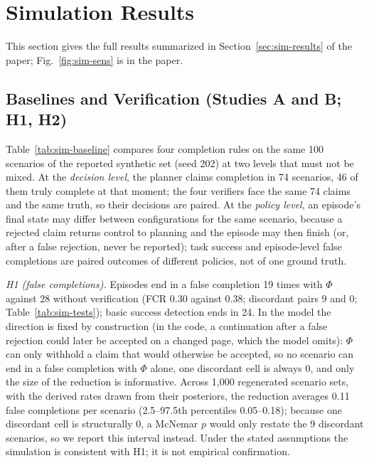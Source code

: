 \section{Simulation Results}
\label{sec:sim-results-full}

This section gives the full results summarized in Section~\ref{sec:sim-results} of the paper; Fig.~\ref{fig:sim-sens} is in the paper.

\noindent{}

\subsection{Baselines and Verification (Studies A and B; H1, H2)}





Table~\ref{tab:sim-baseline} compares four completion rules on the same 100 scenarios of the reported synthetic set (seed 202) at two levels that must not be mixed. At the \emph{decision level}, the planner claims completion in 74 scenarios, 46 of them truly complete at that moment; the four verifiers face the same 74 claims and the same truth, so their decisions are paired. At the \emph{policy level}, an episode's final state may differ between configurations for the same scenario, because a rejected claim returns control to planning and the episode may then finish (or, after a false rejection, never be reported); task success and episode-level false completions are paired outcomes of different policies, not of one ground truth.

\emph{H1 (false completions).} Episodes end in a false completion 19 times with $\Phi$ against 28 without verification (FCR 0.30 against 0.38; discordant pairs 9 and 0; Table~\ref{tab:sim-tests}); basic success detection ends in 24. In the model the direction is fixed by construction (in the code, a continuation after a false rejection could later be accepted on a changed page, which the model omits): $\Phi$ can only withhold a claim that would otherwise be accepted, so no scenario can end in a false completion with $\Phi$ alone, one discordant cell is always 0, and only the size of the reduction is informative. Across 1{,}000 regenerated scenario sets, with the derived rates drawn from their posteriors, the reduction averages 0.11 false completions per scenario (2.5--97.5th percentiles 0.05--0.18); because one discordant cell is structurally 0, a McNemar $p$ would only restate the 9 discordant scenarios, so we report this interval instead. Under the stated assumptions the simulation is consistent with H1; it is not empirical confirmation.

